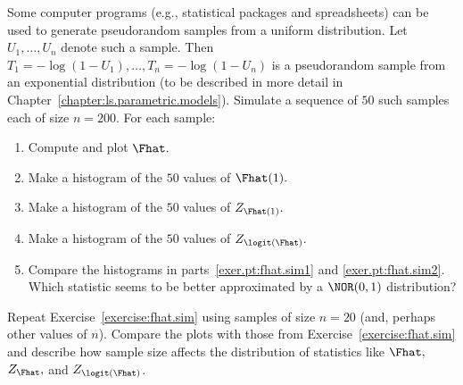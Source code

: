 \begin{exercise}
\label{exercise:fhat.sim}
Some computer programs (e.g., statistical packages and spreadsheets)
can be used to generate pseudorandom samples from a uniform
distribution.  Let $U_{1},\ldots,U_{n}$ denote such a sample. Then
$T_{1}=-\log(1-U_{1}),\ldots,T_{n}=-\log(1-U_{n})$ is a pseudorandom
sample from an exponential distribution (to be described in more
detail in Chapter~\ref{chapter:ls.parametric.models}).  Simulate a
sequence of $50$ such samples each of size $n=200.$ For each sample:
\begin{enumerate}
\item
Compute and plot $\Fhat.$
\item
Make a histogram of the $50$ values of $\Fhat(1).$
\item
\label{exer.pt:fhat.sim1}
Make a histogram of the $50$ values of $Z_{\Fhat(1)}.$
\item
\label{exer.pt:fhat.sim2}
Make a histogram of the $50$ values of $Z_{\logit(\Fhat)}.$
\item
Compare the histograms in parts~\ref{exer.pt:fhat.sim1} and
\ref{exer.pt:fhat.sim2}. Which statistic seems to be better
approximated by a $\NOR(0,1)$ distribution?
\end{enumerate}
\end{exercise}

\begin{exercise}
Repeat Exercise~\ref{exercise:fhat.sim} using samples of size $n=20$
(and, perhaps other values of $n$).  Compare the plots
with those from
Exercise~\ref{exercise:fhat.sim} and describe how sample
size affects the distribution of statistics like $\Fhat,$ $Z_{\Fhat},$
and $Z_{\logit(\Fhat)}$.
\end{exercise}

